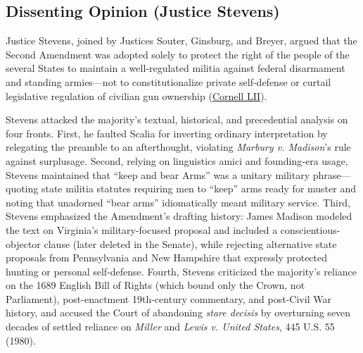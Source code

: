 \documentclass[12pt]{article}
\begin{document}
\subsection{Dissenting Opinion (Justice Stevens)}
Justice Stevens, joined by Justices Souter, Ginsburg, and Breyer, argued that the Second Amendment was adopted solely to protect the right of the people of the several States to maintain a well-regulated militia against federal disarmament and standing armies---not to constitutionalize private self-defense or curtail legislative regulation of civilian gun ownership (\href{https://www.law.cornell.edu/supct/html/07-290.ZD.html}{Cornell LII}).

Stevens attacked the majority's textual, historical, and precedential analysis on four fronts. First, he faulted Scalia for inverting ordinary interpretation by relegating the preamble to an afterthought, violating \textit{Marbury v. Madison}'s rule against surplusage. Second, relying on linguistics amici and founding-era usage, Stevens maintained that ``keep and bear Arms'' was a unitary military phrase---quoting state militia statutes requiring men to ``keep'' arms ready for muster and noting that unadorned ``bear arms'' idiomatically meant military service. Third, Stevens emphasized the Amendment's drafting history: James Madison modeled the text on Virginia's military-focused proposal and included a conscientious-objector clause (later deleted in the Senate), while rejecting alternative state proposals from Pennsylvania and New Hampshire that expressly protected hunting or personal self-defense. Fourth, Stevens criticized the majority's reliance on the 1689 English Bill of Rights (which bound only the Crown, not Parliament), post-enactment 19th-century commentary, and post-Civil War history, and accused the Court of abandoning \textit{stare decisis} by overturning seven decades of settled reliance on \textit{Miller} and \textit{Lewis v. United States}, 445 U.S. 55 (1980).
\end{document}
